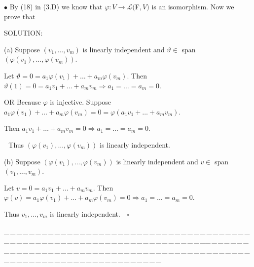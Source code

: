 \documentclass[a4paper, 11pt, UTF8]{article}
\def\Lm{\mathcal{L}}
\begin{document}
\begin{large}
{\small $\bullet$} By (18) in (3.D) {\timessl\Large
 we know that $\varphi:V\rightarrow\Lm(${\timesbf F}$,V)$ is an isomorphism. Now we prove that}\par{}\par
{\timesbf S\footnotesize{OLUTION:}}\par\quad
(a) Suppose $(v_1,\dots,v_m)$ is linearly independent and $\vartheta\in$ span$(\varphi(v_1),\dots,\varphi(v_m))$.\par\qquad
Let $\vartheta=0=a_1\varphi(v_1)+\dots+a_m\varphi(v_m).$ Then $\vartheta(1)=0=a_1 v_1+\dots+a_m v_m\Rightarrow a_1=\dots=a_m=0.$\par\qquad
O{\small R} Because $\varphi$ is injective. Suppose $a_1\varphi(v_1)+\dots+a_m\varphi(v_m)=0=\varphi(a_1 v_1+\dots+a_m v_m).$\par\qquad Then $a_1 v_1+\dots+a_m v_m=0\Rightarrow a_1=\dots=a_m=0.$\par\quad\,\,
Thus $(\varphi(v_1),\dots,\varphi(v_m))$ is linearly independent.\par\quad
(b) Suppose $(\varphi(v_1),\dots,\varphi(v_m))$ is linearly independent and $v\in$ span$(v_1,\dots,v_m).$\par\qquad
Let $v=0=a_1 v_1+\dots+a_m v_m.$ Then $\varphi(v)=a_1\varphi(v_1)+\dots+a_m\varphi(v_m)=0 \Rightarrow a_1=\dots=a_m=0.$\par\qquad
Thus $v_1,\dots,v_m$ is linearly independent. $\,\,\,\,\square$\par
{\tiny \_\,\_\,\_\,\_\,\_\,\_\,\_\,\_\,\_\,\_\,\_\,\_\,\_\,\_\,\_\,\_\,\_\,\_\,\_\,\_\,\_\,\_\,\_\,\_\,\_\,\_\,\_\,\_\,\_\,\_\,\_\,\_\,\_\,\_\,\_\,\_\,\_\,\_\,\_\,\_\,\_\,\_\,\_\,\_\,\_\,\_\,\_\,\_\,\_\,\_\,\_\,\_\,\_\,\_\,\_\,\_\,\_\,\_\,\_\,\_\,\_\,\_\,\_\,\_\,\_\,\_\,\_\,\_\,\_\,\_\,\_\_\,\_\,\_\,\_\,\_\,\_\,\_\,\_\,\_\,\_\,\_\,\_\,\_\,\_\,\_\,\_\,\_\,\_\,\_\,\_\,\_\,\_\,\_\,\_\,\_\,\_\,\_\,\_\,\_\,\_\,\_\,\_\,\_\,\_\,\_\,\_\,\_\,\_\,\_\,\_\,\_\,\_\,\_\,\_\,\_\,\_\,\_\,\_\,\_\,\_\,\_\,\_\,\_\,\_\,\_\,\_\,\_\,\_\,\_\,\_\,\_\,\_\,\_\,\_\,\_\,\_\,\_\,\_\,\_\,\_\,\_}{\tiny\,\par}


\end{large}
\end{document}
